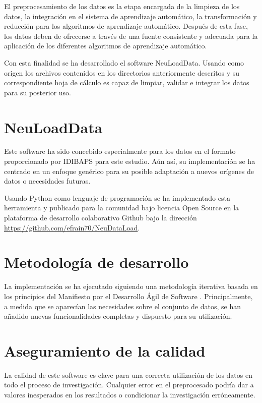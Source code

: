 El preprocesamiento de los datos es la etapa encargada de la limpieza de los datos, la integración en el sistema de aprendizaje automático, la transformación y reducción para los algoritmos de aprendizaje automático. Después de esta fase, los datos deben de ofrecerse a través de una fuente consistente y adecuada para la aplicación de los diferentes algoritmos de aprendizaje automático.

Con esta finalidad se ha desarrollado el software NeuLoadData. Usando como origen los archivos contenidos en los directorios anteriormente descritos y su correspondiente hoja de cálculo es capaz de limpiar, validar e integrar los datos para su posterior uso.

\section{NeuLoadData}
Este software ha sido concebido especialmente para los datos en el formato proporcionado por IDIBAPS para este estudio. Aún así, su implementación se ha centrado en un enfoque genérico para su posible adaptación a nuevos orígenes de datos o necesidades futuras.

Usando Python como lenguaje de programación se ha implementado esta herramienta y publicado para la comunidad bajo licencia Open Source en la plataforma de desarrollo colaborativo Github \cite{WhatGitHub} bajo la dirección \url{https://github.com/efrain70/NeuDataLoad}.

\section{Metodología de desarrollo}

La implementación se ha ejecutado siguiendo una metodología iterativa basada en los principios del Manifiesto por el Desarrollo Ágil de Software \cite{ManifiestoSoftware}. Principalmente, a medida que se aparecían las necesidades sobre el conjunto de datos, se han añadido nuevas funcionalidades completas y dispuesto para su utilización.

\section{Aseguramiento de la calidad}

La calidad de este software es clave para una correcta utilización de los datos en todo el proceso de investigación. Cualquier error en el preprocesado podría dar a valores inesperados en los resultados o condicionar la investigación erróneamente.

